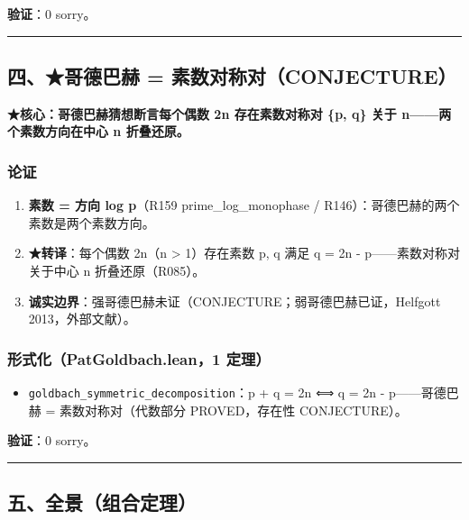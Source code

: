 \documentclass[
]{article}
\providecommand{\tightlist}{%
  \setlength{\itemsep}{0pt}\setlength{\parskip}{0pt}}
\begin{document}
\textbf{验证}：0 sorry。

\begin{center}\rule{0.5\linewidth}{0.5pt}\end{center}

\subsection{四、★哥德巴赫 =
素数对称对（CONJECTURE）}\label{ux56dbux54e5ux5fb7ux5df4ux8d6b-ux7d20ux6570ux5bf9ux79f0ux5bf9conjecture}

\textbf{★核心：哥德巴赫猜想断言每个偶数 2n 存在素数对称对 \{p, q\} 关于
n------两个素数方向在中心 n 折叠还原。}

\subsubsection{论证}\label{ux8bbaux8bc1-3}

\begin{enumerate}
\def\labelenumi{\arabic{enumi}.}
\tightlist
\item
  \textbf{素数 = 方向 log p}（R159 prime\_log\_monophase /
  R146）：哥德巴赫的两个素数是两个素数方向。
\item
  \textbf{★转译}：每个偶数 2n（n \textgreater{} 1）存在素数 p, q 满足 q
  = 2n - p------素数对称对关于中心 n 折叠还原（R085）。
\item
  \textbf{诚实边界}：强哥德巴赫未证（CONJECTURE；弱哥德巴赫已证，Helfgott
  2013，外部文献）。
\end{enumerate}

\subsubsection{形式化（PatGoldbach.lean，1
定理）}\label{ux5f62ux5f0fux5316patgoldbach.lean1-ux5b9aux7406-2}

\begin{itemize}
\tightlist
\item
  \texttt{goldbach\_symmetric\_decomposition}：p + q = 2n ⟺ q = 2n -
  p------哥德巴赫 = 素数对称对（代数部分 PROVED，存在性 CONJECTURE）。
\end{itemize}

\textbf{验证}：0 sorry。

\begin{center}\rule{0.5\linewidth}{0.5pt}\end{center}

\subsection{五、全景（组合定理）}\label{ux4e94ux5168ux666fux7ec4ux5408ux5b9aux7406}
\end{document}
